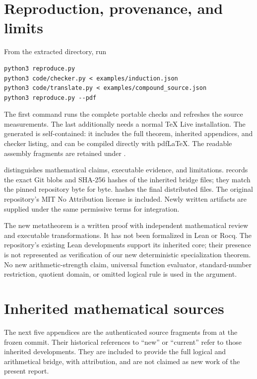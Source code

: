 \documentclass[11pt,letterpaper]{article}
\theoremstyle{definition}
\begin{document}
\section{Reproduction, provenance, and limits}

From the extracted directory, run
\begin{lstlisting}
python3 reproduce.py
python3 code/checker.py < examples/induction.json
python3 code/translate.py < examples/compound_source.json
python3 reproduce.py --pdf
\end{lstlisting}
The first command runs the complete portable checks and refreshes the
source measurements. The last additionally needs a normal TeX Live
installation. The generated  is self-contained:
it includes the full theorem, inherited appendices, and checker listing,
and can be compiled directly with pdfLaTeX. The readable assembly
fragments are retained under .

 distinguishes mathematical claims, executable evidence,
and limitations.  records the exact Git
blobs and SHA-256 hashes of the inherited bridge files; they match the
pinned repository byte for byte.  hashes the final
distributed files. The original repository's MIT No Attribution license
is included. Newly written artifacts are supplied under the same
permissive terms for integration.

The new metatheorem is a written proof with independent mathematical
review and executable transformations. It has not been formalized in
Lean or Rocq. The repository's existing Lean developments support its
inherited core; their presence is not represented as verification of
our new deterministic specialization theorem. No new arithmetic-strength
claim, universal function evaluator, standard-number restriction,
quotient domain, or omitted logical rule is used in the argument.

\appendix
\section{Inherited mathematical sources}
The next five appendices are the authenticated source fragments from
 at the frozen commit. Their
historical references to ``new'' or ``current'' refer to those inherited
developments. They are included to provide the full logical and
arithmetical bridge, with attribution, and are not claimed as new work
of the present report.
\end{document}
